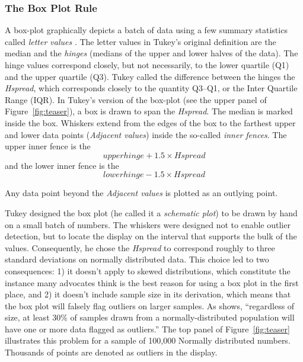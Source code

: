 \documentclass[12pt]{article}
\begin{document}
\subsubsection{The Box Plot Rule}
A box-plot graphically depicts a batch of data using a few summary statistics called {\it letter values} \citep{EDA,FriggeHoaglinIglewicz}.  The letter values in Tukey's original definition are the median and the {\it hinges} (medians of the upper and lower halves of the data). The hinge values correspond closely, but not necessarily, to the lower quartile (Q1) and the upper quartile (Q3). Tukey called the difference between the hinges the {\it Hspread}, which corresponds closely to the quantity Q3--Q1, or the Inter Quartile Range (IQR). In Tukey's version of the box-plot (see the upper panel of Figure~\ref{fig:teaser}), a box is drawn to span the {\it Hspread}. The median is marked inside the box. Whiskers extend from the edges of the box to the farthest upper and lower data points ({\it Adjacent values}) inside the so-called {\it inner fences}. The upper inner fence is the \\
\begin{equation*}
upper hinge + 1.5 \times Hspread
\end{equation*}
and the lower inner fence is the \\
\begin{equation*}
lower hinge - 1.5 \times Hspread
\end{equation*}

Any data point beyond the {\it Adjacent values} is plotted as an outlying point. \footnotemark


Tukey designed the box plot (he called it a {\it schematic plot}) to be drawn by hand on a small batch of numbers. The whiskers were designed not to enable outlier detection, but to locate the display on the interval that supports the bulk of the values. Consequently, he chose the {\it Hspread} to correspond roughly to three standard deviations on normally distributed data. This choice led to two consequences: 1) it doesn't apply to skewed distributions, which constitute the instance many advocates think is the best reason for using a box plot in the first place, and 2) it doesn't include sample size in its derivation, which means that the box plot will falsely flag outliers on larger samples. As \cite{Dawson} shows,  ``regardless of size, at least 30\% of samples drawn from a normally-distributed population will have one or more data flagged as outliers.'' The top panel of Figure~\ref{fig:teaser} illustrates this problem for a sample of 100,000 Normally distributed numbers. Thousands of points are denoted as outliers in the display.
\end{document}
